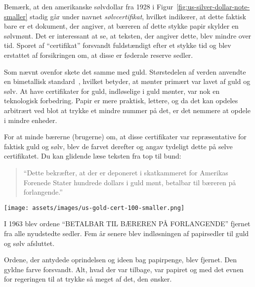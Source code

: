 Bemærk, at den amerikanske sølvdollar fra 1928 i
Figur~\ref{fig:us-silver-dollar-note-smaller} stadig går under navnet
\textit{sølvcertifikat}, hvilket indikerer, at dette faktisk bare er et 
dokument, der angiver, at bæreren af dette stykke papir skylder en sølvmønt. 
Det er interessant at se, at teksten, der angiver dette, blev mindre over tid. 
Sporet af \enquote{certifikat} forsvandt fuldstændigt efter et stykke tid og 
blev erstattet af forsikringen om, at disse er føderale reserve sedler.

Som nævnt ovenfor skete det samme med guld. Størstedelen af verden anvendte en
bimetallisk standard~\cite{wiki:bimetallism}, hvilket betyder, at mønter primært
var lavet af guld og sølv. At have certifikater for guld, indløselige i
guld mønter, var nok en teknologisk forbedring. Papir er mere praktisk,
lettere, og da det kan opdeles arbitrært ved blot at trykke et mindre
nummer på det, er det nemmere at opdele i mindre enheder.

For at minde bærerne (brugerne) om, at disse certifikater var
repræsentative for faktisk guld og sølv, blev de farvet derefter
og angav tydeligt dette på selve certifikatet. Du kan glidende læse
teksten fra top til bund:

\begin{quotation}\begin{samepage}
  \enquote{Dette bekræfter, at der er deponeret i skatkammeret for
  Amerikas Forenede Stater hundrede dollars i guld mønt, betalbar til
  bæreren på forlangende.}
\end{samepage}\end{quotation}
  
\begin{center}
  \centering
  \texttt{[image: assets/images/us-gold-cert-100-smaller.png]}
  \label{fig:us-gold-cert-100-smaller}
\end{center}

I 1963 blev ordene \enquote{BETALBAR TIL BÆREREN PÅ FORLANGENDE} fjernet fra
alle nyudstedte sedler. Fem år senere blev indløsningen af papirsedler
til guld og sølv afsluttet.

Ordene, der antydede oprindelsen og ideen bag papirpenge, blev
fjernet. Den gyldne farve forsvandt. Alt, hvad der var tilbage, var papiret
og med det evnen for regeringen til at trykke så meget af det, den ønsker.

